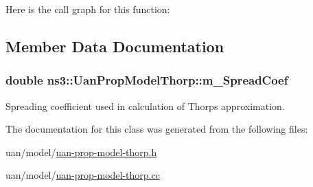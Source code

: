 Here is the call graph for this function\+:




\subsection{Member Data Documentation}
\subsubsection[{\texorpdfstring{m\+\_\+\+Spread\+Coef}{m_SpreadCoef}}]{\setlength{\rightskip}{0pt plus 5cm}double ns3\+::\+Uan\+Prop\+Model\+Thorp\+::m\+\_\+\+Spread\+Coef\hspace{0.3cm}{\ttfamily [private]}}\hypertarget{classns3_1_1UanPropModelThorp_ade697d025d7d23ea54b3267c40cb9f88}{}\label{classns3_1_1UanPropModelThorp_ade697d025d7d23ea54b3267c40cb9f88}


Spreading coefficient used in calculation of Thorp\textquotesingle{}s approximation. 



The documentation for this class was generated from the following files\+:\begin{DoxyCompactItemize}
\item 
uan/model/\hyperlink{uan-prop-model-thorp_8h}{uan-\/prop-\/model-\/thorp.\+h}\item 
uan/model/\hyperlink{uan-prop-model-thorp_8cc}{uan-\/prop-\/model-\/thorp.\+cc}\end{DoxyCompactItemize}
